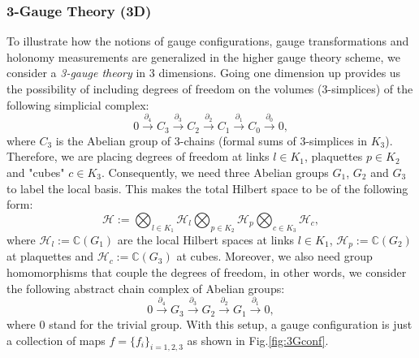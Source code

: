 \documentclass[titlepage,11pt]{article}
\theoremstyle{plain}%
\theoremstyle{definition}
\theoremstyle{remark}
\begin{document}
\subsubsection{3-Gauge Theory (3D)} To illustrate how the notions of gauge configurations, gauge transformations and holonomy measurements are generalized in the higher gauge theory scheme, we consider a \emph{3-gauge theory} in 3 dimensions. Going one dimension up provides us the possibility of including degrees of freedom on the volumes (3-simplices) of the following simplicial complex:
\begin{equation}\label{eq:GeomChainCompAbQDM}
0 \xrightarrow{\partial_{4}} C_3 \xrightarrow{\partial_{3}} C_{2} \xrightarrow{\partial_2}  C_{1}  \xrightarrow{\partial_1} C_0 \xrightarrow{\partial_0} 0,
 \end{equation}
where $C_3$ is the Abelian group of 3-chains (formal sums of 3-simplices in $K_3$).  Therefore, we are placing degrees of freedom at links $l \in K_1$, plaquettes $p \in K_2$ and "cubes" $c \in K_3$. Consequently, we need three Abelian groups $G_1$, $G_2$ and $G_3$ to label the local basis. This makes the total Hilbert space to be of the following form:
\begin{equation}\label{eq:Hilb3G}
\mathcal{H}:=\bigotimes_{l\in K_1} \mathcal{H}_l \bigotimes_{p \in K_2} \mathcal{H}_p \bigotimes_{c \in K_3} \mathcal{H}_c,
\end{equation}
where $\mathcal{H}_l:= \mathbb{C}(G_1)$ are the local Hilbert spaces at links $l \in K_1$,  $\mathcal{H}_p:= \mathbb{C}(G_2)$ at plaquettes and $\mathcal{H}_c:= \mathbb{C}(G_3)$ at cubes. Moreover, we also need group homomorphisms that couple the degrees of freedom, in other words, we consider the following abstract chain complex of Abelian groups:
\begin{equation}\label{eq:Abcc3G}
 0\xrightarrow{\partial_4}  G_3\xrightarrow{\partial_3}G_2\xrightarrow{\partial_2} G_1\xrightarrow{\partial_1} 0,
\end{equation}
where $0$ stand for the trivial group. With this setup, a gauge configuration is just a collection of maps $f=\{f_i\}_{i=1,2,3}$ as shown in Fig.\ref{fig:3Gconf}.
\end{document}
